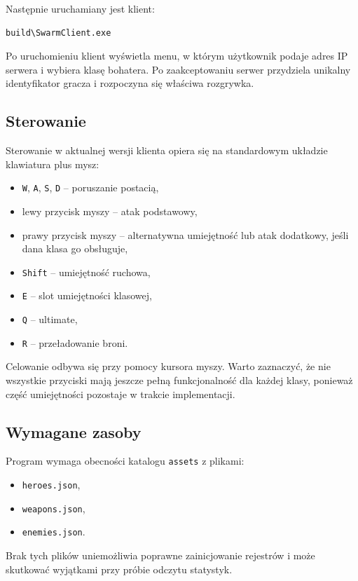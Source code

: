 \documentclass[a4paper,12pt]{article}
\begin{document}
Następnie uruchamiany jest klient:
\begin{verbatim}
build\SwarmClient.exe
\end{verbatim}

Po uruchomieniu klient wyświetla menu, w którym użytkownik podaje adres IP serwera i wybiera klasę bohatera. Po zaakceptowaniu serwer przydziela unikalny identyfikator gracza i rozpoczyna się właściwa rozgrywka.

\subsection{Sterowanie}
Sterowanie w aktualnej wersji klienta opiera się na standardowym układzie klawiatura plus mysz:
\begin{itemize}[leftmargin=1.5cm]
    \item \texttt{W}, \texttt{A}, \texttt{S}, \texttt{D} -- poruszanie postacią,
    \item lewy przycisk myszy -- atak podstawowy,
    \item prawy przycisk myszy -- alternatywna umiejętność lub atak dodatkowy, jeśli dana klasa go obsługuje,
    \item \texttt{Shift} -- umiejętność ruchowa,
    \item \texttt{E} -- slot umiejętności klasowej,
    \item \texttt{Q} -- ultimate,
    \item \texttt{R} -- przeładowanie broni.
\end{itemize}

Celowanie odbywa się przy pomocy kursora myszy. Warto zaznaczyć, że nie wszystkie przyciski mają jeszcze pełną funkcjonalność dla każdej klasy, ponieważ część umiejętności pozostaje w trakcie implementacji.

\subsection{Wymagane zasoby}
Program wymaga obecności katalogu \texttt{assets} z plikami:
\begin{itemize}[leftmargin=1.5cm]
    \item \texttt{heroes.json},
    \item \texttt{weapons.json},
    \item \texttt{enemies.json}.
\end{itemize}

Brak tych plików uniemożliwia poprawne zainicjowanie rejestrów i może skutkować wyjątkami przy próbie odczytu statystyk.
\end{document}
